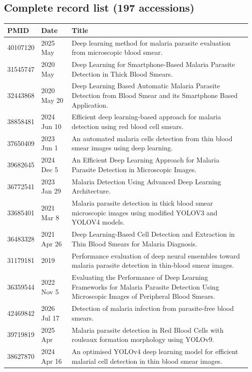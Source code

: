 \subsection*{Complete record list (197 accessions)}
\begin{longtable}{llp{9.5cm}}
\hline
PMID & Date & Title \\
\hline
40107120 & 2025 May & Deep learning method for malaria parasite evaluation from microscopic blood smear. \\
31545747 & 2020 May & Deep Learning for Smartphone-Based Malaria Parasite Detection in Thick Blood Smears. \\
32443868 & 2020 May 20 & Deep Learning Based Automatic Malaria Parasite Detection from Blood Smear and its Smartphone Based Application. \\
38858481 & 2024 Jun 10 & Efficient deep learning-based approach for malaria detection using red blood cell smears. \\
37650409 & 2023 Jun 1 & An automated malaria cells detection from thin blood smear images using deep learning. \\
39682645 & 2024 Dec 5 & An Efficient Deep Learning Approach for Malaria Parasite Detection in Microscopic Images. \\
36772541 & 2023 Jan 29 & Malaria Detection Using Advanced Deep Learning Architecture. \\
33685401 & 2021 Mar 8 & Malaria parasite detection in thick blood smear microscopic images using modified YOLOV3 and YOLOV4 models. \\
36483328 & 2021 Apr 26 & Deep Learning-Based Cell Detection and Extraction in Thin Blood Smears for Malaria Diagnosis. \\
31179181 & 2019 & Performance evaluation of deep neural ensembles toward malaria parasite detection in thin-blood smear images. \\
36359544 & 2022 Nov 5 & Evaluating the Performance of Deep Learning Frameworks for Malaria Parasite Detection Using Microscopic Images of Peripheral Blood Smears. \\
42469842 & 2026 Jul 17 & Detection of malaria infection from parasite-free blood smears. \\
39719819 & 2025 Apr & Malaria parasite detection in Red Blood Cells with rouleaux formation morphology using YOLOv9. \\
38627870 & 2024 Apr 16 & An optimised YOLOv4 deep learning model for efficient malarial cell detection in thin blood smear images. \\

\end{longtable}

